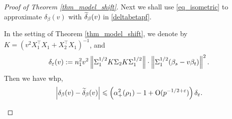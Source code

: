 \begin{proof}[Proof of Theorem \ref{thm_model_shift}]
Next we shall use \eqref{eq_isometric} to approximate $\delta_\beta(v)$ with $\widetilde\delta_\beta(v)$ in \eqref{deltabetapf}.  
\begin{lemma}\label{prop_model_shift}
	In the setting of Theorem \ref{thm_model_shift},
	we denote by $K = (v^2X_1^{\top}X_1 + X_2^{\top}X_1)^{-1}$, and
	\begin{align*}
		\delta_{\varepsilon}(v) := n_1^2 v^2 \left\| \Sigma_1^{1/2} K \Sigma_2 K \Sigma_1^{1/2} \right\| \cdot \left\| \Sigma_1^{1/2} (\beta_s - v\beta_t) \right\|^2.
	\end{align*}
	Then we have whp,
	\begin{align*}
		 \left| \delta_\beta(v)-\widetilde\delta_\beta(v)\right| 
		\leqslant  \left( \alpha_+^2(\rho_1)-1 + \operatorname{O}(p^{-1/2+{\varepsilon}})\right)\delta_{\varepsilon}.
	\end{align*}
\end{lemma}


\end{proof}
